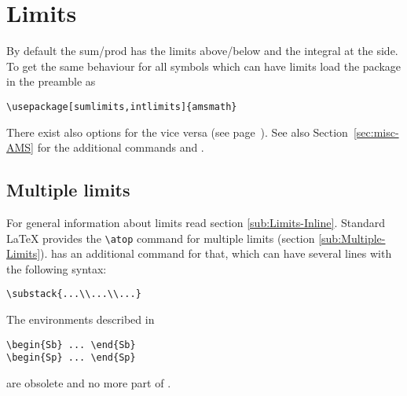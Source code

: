 \begin{table}[htb]
\section{Limits}\label{sec:limit-AMS}

By default the sum/prod has the limits above/below and the integral
at the side. To get the same behaviour for all symbols which can have
limits load the package \AmSmath in the preamble as    %

\begin{lstlisting}
\usepackage[sumlimits,intlimits]{amsmath}
\end{lstlisting}

There exist also options for the vice versa (see page~\pageref{par:AMSmath-package}).    %
See also Section~\ref{sec:misc-AMS} for the additional commands  and .



\subsection{Multiple limits}

For general information about limits read section
\vref{sub:Limits-Inline}. Standard \LaTeX{} provides the \texttt{\textbackslash{}atop} command
for multiple limits (section \vref{sub:Multiple-Limits}). \AmSmath {}
has an additional command for that, which
can have several lines with the following syntax:

\begin{lstlisting}
\substack{...\\...\\...}
\end{lstlisting}

The environments described in \cite{MathGuide}

\begin{lstlisting}
\begin{Sb} ... \end{Sb}
\begin{Sp} ... \end{Sp}
\end{lstlisting}
are obsolete and no more part of \AmSmath.


\end{table}
